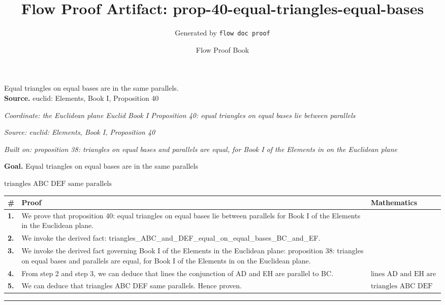 \documentclass[11pt]{article}
\title{Flow Proof Artifact: prop-40-equal-triangles-equal-bases}
\author{Generated by \texttt{flow doc proof}}
\date{Flow Proof Book}
\theoremstyle{definition}
\begin{document}
\maketitle
Equal triangles on equal bases are in the same parallels.\\[0.5em]
\textbf{Source.} euclid: Elements, Book I, Proposition 40\\[0.5em]
\bigskip
{}\par
\smallskip\noindent\textit{Coordinate: the Euclidean plane \cdot Euclid Book I \cdot Proposition 40: equal triangles on equal bases lie between parallels}\par
\smallskip\noindent\textit{Source: euclid: Elements, Book I, Proposition 40}\par
\smallskip\noindent\textit{Built on: proposition 38: triangles on equal bases and parallels are equal, for Book I of the Elements in on the Euclidean plane}\par
\medskip
\noindent\textbf{Goal.} Equal triangles on equal bases are in the same parallels\par
\noindent$\displaystyle \text{triangles ABC DEF same parallels}$\par
\medskip
\noindent
\begin{tabular}{@{} >{\raggedright\arraybackslash}p{} >{\raggedright\arraybackslash}p{} >{\raggedleft\arraybackslash}p{} @{}}
\textbf{\#} & \textbf{Proof} & \textbf{Mathematics} \\
\midrule
\textbf{1.} & We prove that proposition 40: equal triangles on equal bases lie between parallels for Book I of the Elements in the Euclidean plane. & \\[0.45em]
\textbf{2.} & We invoke the derived fact: triangles\_ABC\_and\_DEF\_equal\_on\_equal\_bases\_BC\_and\_EF. & \\[0.45em]
\textbf{3.} & We invoke the derived fact governing Book I of the Elements in the Euclidean plane: proposition 38: triangles on equal bases and parallels are equal, for Book I of the Elements in on the Euclidean plane. & \\[0.45em]
\textbf{4.} & From step 2 and step 3, we can deduce that lines the conjunction of AD and EH are parallel to BC. & $\displaystyle \text{lines AD and EH are parallel to BC}$ \\[0.45em]
\textbf{5.} & We can deduce that triangles ABC DEF same parallels. Hence proven. & $\displaystyle \text{triangles ABC DEF same parallels}$ \\[0.45em]
\bottomrule
\end{tabular}
\label{thm:Geometry-Euclid Book I-proposition_40_equal_triangles_on_equal_bases_lie_between_parallels}
\par\medskip\hrule
\end{document}

